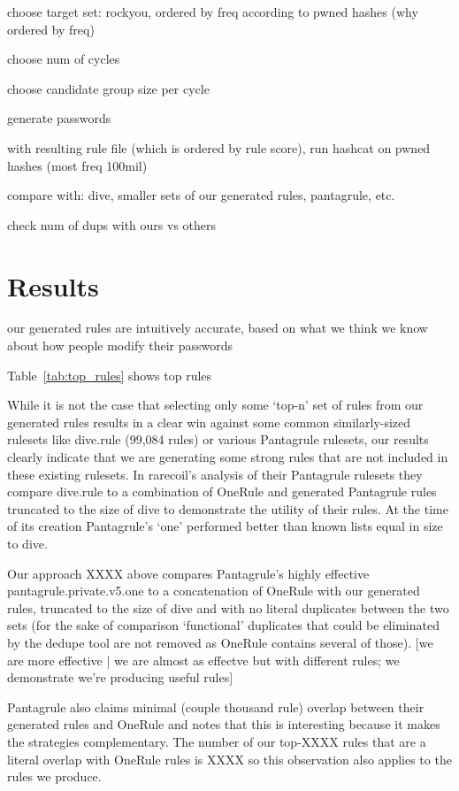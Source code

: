 \documentclass[letterpaper,twocolumn,10pt]{article}
\begin{document}
choose target set: rockyou, ordered by freq according to pwned hashes (why
ordered by freq)

choose num of cycles

choose candidate group size per cycle

generate passwords

with resulting rule file (which is ordered by rule score), run hashcat on pwned
hashes (most freq 100mil)

compare with: dive, smaller sets of our generated rules, pantagrule, etc.

check num of dups with ours vs others

\section{Results}

our generated rules are intuitively accurate, based on what we think we know
about how people modify their passwords

Table~\ref{tab:top_rules} shows top rules

While it is not the case that selecting only some `top-n' set of rules from our
generated rules results in a clear win against some common similarly-sized rulesets
like dive.rule (99,084 rules) or various Pantagrule rulesets, our results clearly
indicate that we are generating some strong rules that are not included in these
existing rulesets. In rarecoil's analysis of their Pantagrule rulesets they compare
dive.rule to a combination of OneRule and generated Pantagrule rules truncated to
the size of dive to demonstrate the utility of their rules. At the time of its
creation Pantagrule's `one' performed better than known lists equal in size to dive.

Our approach XXXX above compares Pantagrule's highly effective pantagrule.private.v5.one
to a concatenation of OneRule with our generated rules, truncated to the size of dive
and with no literal duplicates between the two sets (for the sake of comparison `functional'
duplicates that could be eliminated by the dedupe tool are not removed as OneRule contains
several of those).  [we are more effective | we are almost as effectve but with different rules;
we demonstrate we're producing useful rules]

Pantagrule also claims minimal (couple thousand rule) overlap between their generated rules and OneRule
and notes that this is interesting because it makes the strategies complementary. The number of our top-XXXX rules
that are a literal overlap with OneRule rules is XXXX so this observation also applies to the rules we produce.
\end{document}
